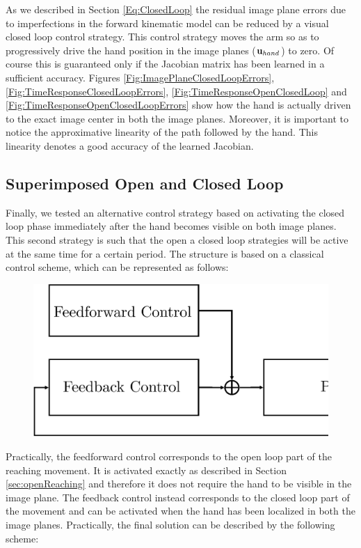 As we described in Section \ref{Eq:ClosedLoop} the residual image plane errors 
due to imperfections in the forward kinematic model can be reduced by a visual closed loop
control strategy. This control strategy moves the arm so as to progressively 
drive the hand position in the image planes ($\mathbf{u}_{hand}$) to zero. Of course this is guaranteed 
only if the  Jacobian matrix has been learned in a sufficient accuracy. Figures 
\ref{Fig:ImagePlaneClosedLoopErrors}, \ref{Fig:TimeResponseClosedLoopErrors},  \ref{Fig:TimeResponseOpenClosedLoop} and \ref{Fig:TimeResponseOpenClosedLoopErrors} 
show how the hand is actually driven to the 
exact image center in both the image planes. Moreover, it is important to notice the
approximative linearity of the path followed by the hand. This linearity denotes 
a good accuracy of the learned Jacobian.

\newpage 
\subsection{Superimposed Open and Closed Loop}

Finally, we tested an alternative control strategy based on activating the closed loop 
phase immediately after the hand becomes visible on both image planes. This second strategy
is such that the open a closed loop strategies will be active at the same time for a 
certain period. The structure is based on a classical control scheme, which can be represented as follows:

\begin{figure}[th!]
\begin{center}
\includegraphics[scale = 0.25]{Figure/OpenVSClosedLoop.eps}
\end{center}
\end{figure}

Practically, the feedforward control corresponds to the open loop part of the reaching movement.
It is activated exactly as described in Section \ref{sec:openReaching} and therefore it does not
require the hand to be visible in the image plane. The feedback control
instead corresponds to the closed loop part of the movement and can be activated when the hand
has been localized in both the image planes. Practically, the final solution can be described by the 
following scheme:

